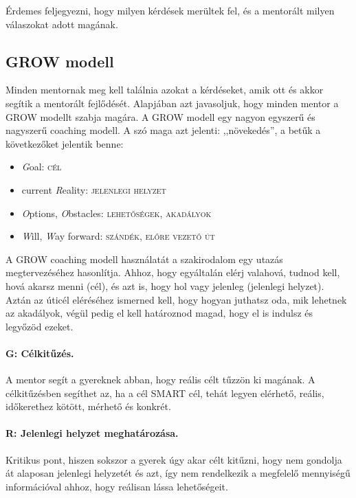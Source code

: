 Érdemes feljegyezni, hogy milyen kérdések merültek fel, és a mentorált
milyen válaszokat adott magának.

\hypertarget{grow-modell}{%
\subsection{GROW modell}\label{grow-modell}}

Minden mentornak meg kell találnia azokat a kérdéseket, amik ott és
akkor segítik a mentorált fejlődését. Alapjában azt javasoljuk, hogy
minden mentor a GROW modellt szabja magára. A GROW modell egy nagyon
egyszerű és nagyszerű coaching modell. A szó maga azt jelenti:
,,növekedés'', a betűk a következőket jelentik benne:

\begin{itemize}
\tightlist
\item
  \emph{G}oal: \textsc{cél}
\item
  current \emph{R}eality: \textsc{jelenlegi helyzet}
\item
  \emph{O}ptions, \emph{O}bstacles: \textsc{lehetőségek, akadályok}
\item
  \emph{W}ill, \emph{W}ay forward: \textsc{szándék, előre vezető út}
\end{itemize}

A GROW coaching modell használatát a szakirodalom egy utazás\break
megtervezéséhez hasonlítja. Ahhoz, hogy egyáltalán elérj valahová,
tudnod kell, hová akarsz menni (cél), és azt is, hogy hol vagy jelenleg
(jelenlegi helyzet). Aztán az úticél eléréséhez ismerned kell, hogy
hogyan juthatsz oda, mik lehetnek az akadályok, végül pedig el kell
határoznod magad, hogy el is indulsz és legyőzöd ezeket.

\paragraph{G: Célkitűzés.} A mentor segít a gyereknek abban, hogy reális célt tűzzön
ki magának. A célkitűzésben segíthet az, ha a cél SMART cél, tehát
legyen elérhető, reális, időkerethez kötött, mérhető és konkrét.

\paragraph{R: Jelenlegi helyzet meghatározása.} Kritikus pont, hiszen sokszor a
gyerek úgy akar célt kitűzni, hogy nem gondolja át alaposan jelenlegi
helyzetét és azt, így nem rendelkezik a megfelelő mennyiségű
információval ahhoz, hogy reálisan lássa lehetőségeit.

